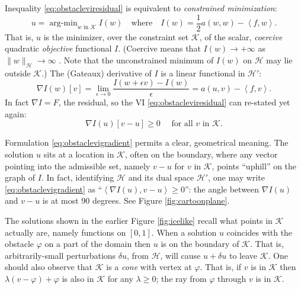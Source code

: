 \documentclass[letterpaper,final,12pt,reqno]{amsart}
\theoremstyle{claim}
\newcommand{\eps}{\epsilon}
\newcommand{\grad}{\nabla}
\newcommand{\ip}[2]{\left<#1,#2\right>}
\numberwithin{equation}{section}
\numberwithin{figure}{section}
\numberwithin{table}{section}
\numberwithin{theorem}{section}
\begin{document}
Inequality \eqref{eq:obstacleviresidual} is equivalent to \emph{constrained minimization}:
\newcommand{\argmin}{\mathop{\mathrm{arg\text{-}min}}}
\begin{equation}
  u = \argmin_{w \text{ in } \mathcal{K}} I(w) \quad \text{where} \quad I(w) = \frac{1}{2} a(w,w) - \ip{f}{w}. \label{eq:obstaclemin}
\end{equation}
That is, $u$ is the minimizer, over the constraint set $\mathcal{K}$, of the scalar, \emph{coercive} quadratic \emph{objective} functional $I$.  (Coercive means that $I(w) \to +\infty$ as $\|w\|_{\mathcal{H}} \to \infty$ \cite{Evans2010}.  Note that the unconstrained minimum of $I(w)$ on $\mathcal{H}$ may lie outside $\mathcal{K}$.)  The (Gateaux) derivative of $I$ is a linear functional in $\mathcal{H}'$:
\begin{equation}
  \grad I(w)[v] = \lim_{\eps\to 0} \frac{I(w+\eps v) - I(w)}{\eps} = a(u,v) - \ip{f}{v}.  \label{eq:gradobjective}
\end{equation}
In fact $\nabla I = F$, the residual, so the VI \eqref{eq:obstacleviresidual} can re-stated yet again:
\begin{equation}
  \nabla I(u)[v-u] \ge 0 \quad \text{ for all } v \text{ in } \mathcal{K}. \label{eq:obstaclevigradient}
\end{equation}

Formulation \eqref{eq:obstaclevigradient} permits a clear, geometrical meaning.  The solution $u$ sits at a location in $\mathcal{K}$, often on the boundary, where any vector pointing into the admissible set, namely $v-u$ for $v$ in $\mathcal{K}$, points ``uphill'' on the graph of $I$.  In fact, identifying $\mathcal{H}$ and its dual space $\mathcal{H}'$, one may write \eqref{eq:obstaclevigradient} as ``$\ip{\nabla I(u)}{v-u} \ge 0$'': the angle between $\nabla I(u)$ and $v-u$ is at most 90 degrees.  See Figure \ref{fig:cartoonplane}.

The solutions shown in the earlier Figure \ref{fig:icelike} recall what points in $\mathcal{K}$ actually are, namely functions on $[0,1]$.  When a solution $u$ coincides with the obstacle $\varphi$ on a part of the domain then $u$ is on the boundary of $\mathcal{K}$.  That is, arbitrarily-small perturbations $\delta u$, from $\mathcal{H}$, will cause $u+\delta u$ to leave $\mathcal{K}$.  One should also observe that $\mathcal{K}$ is a \emph{cone} with vertex at $\varphi$.  That is, if $v$ is in $\mathcal{K}$ then $\lambda(v-\varphi) + \varphi$ is also in $\mathcal{K}$ for any $\lambda \ge 0$; the ray from $\varphi$ through $v$ is in $\mathcal{K}$.
\end{document}
